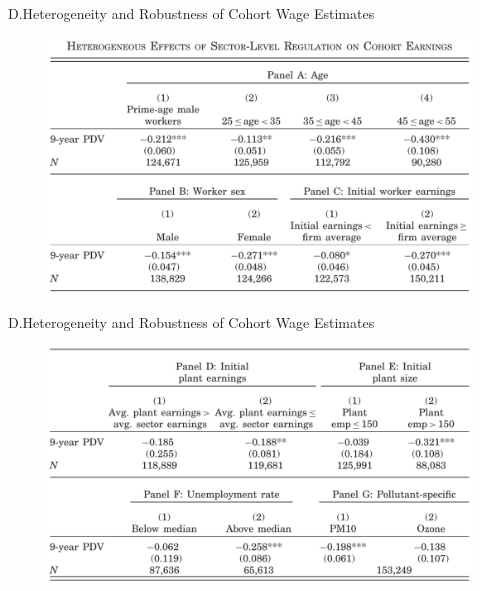 \documentclass{beamer}
\begin{document}
\begin{frame}{D.Heterogeneity and Robustness of Cohort Wage Estimates}
	\begin{figure}[h]
		\centering
		\includegraphics[scale=0.55]{table4_1.png}
	\end{figure}
\end{frame}
\begin{frame}{D.Heterogeneity and Robustness of Cohort Wage Estimates}
	\begin{figure}[h]
		\centering
		\includegraphics[scale=0.5]{table4_2.png}
	\end{figure}
\end{frame}
\end{document}

